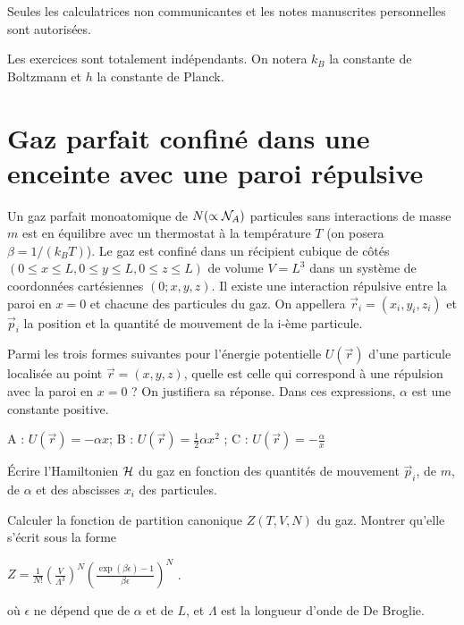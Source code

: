 \documentclass[utf8, 11pt]{feuille}
\begin{document}
Seules les calculatrices non communicantes et les notes manuscrites personnelles sont autorisées.

Les exercices sont totalement indépendants. On notera $k_B$ la constante de Boltzmann et $h$ la constante de Planck.



\section{Gaz parfait confiné dans une enceinte avec une paroi répulsive}

Un gaz parfait monoatomique de $N (\propto {\cal N}_A)$ particules sans interactions de masse $m$ est en équilibre avec un thermostat à la
température $T$ (on posera $\beta =1/(k_B T)$). Le gaz est confiné dans un récipient cubique de côtés $(0 \le x \le L,  0 \le y \le L, 0 \le z \le L)$ de volume $V = L^3$ dans un système de coordonnées cartésiennes $(0; x, y, z)$. Il existe une interaction répulsive entre la  paroi en $x = 0$ et chacune des particules du gaz. On appellera
$\vec{r}_i=(x_i,y_i,z_i)$ et $\vec{p}_i$ la position et la quantité de mouvement de la i-\`eme particule.


\question
Parmi les trois formes suivantes pour l’énergie potentielle $U(\vec{r})$ d’une particule localisée au point $\vec{r}=(x,y,z)$, quelle est celle qui correspond à une répulsion avec la paroi en $x = 0$ ? On justifiera sa réponse. Dans ces expressions, $\alpha$ est une constante positive.
\begin{center}
A : $U(\vec{r})=-\alpha x$; B : $U(\vec{r})=\frac{1}{2} \alpha x^2$ ; C : $U(\vec{r})=-\frac{\alpha}{x}$
\end{center}


\question
Écrire l'Hamiltonien ${\cal H}$ du gaz en fonction des quantités de mouvement $\vec{p}_i$, de $m$, de $\alpha$ et des abscisses $x_i$ des particules.


\question
Calculer la fonction de partition canonique $Z(T,V,N)$ du gaz. Montrer qu'elle s’écrit sous la forme
\begin{center}
    $Z =\frac{1}{N!}(\frac{V}{\Lambda^3})^N \left( \frac{\exp(\beta \epsilon)-1}{\beta \epsilon} \right)^N$ .
\end{center}
où $\epsilon$ ne dépend que de $\alpha$ et de  $L$, et $\Lambda$ est la longueur d'onde de De Broglie. 
\end{document}
